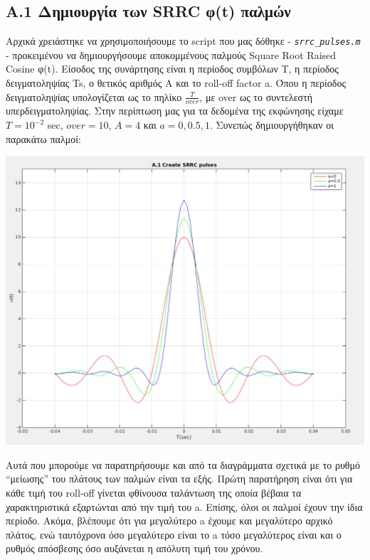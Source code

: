\documentclass[11pt]{article}
\begin{document}
    \subsection*{Α.1 Δημιουργία των SRRC φ(t) παλμών}
    Αρχικά χρειάστηκε να χρησιμοποιήσουμε το script που μας δόθηκε - \emph{\texttt{srrc\_pulses.m}} - προκειμένου να δημιουργήσουμε αποκομμένους παλμούς Square Root Raised Cosine φ(t). Είσοδος της συνάρτησης είναι η περίοδος συμβόλων T, η περίοδος δειγματοληψίας Ts, ο θετικός αριθμός Α και το roll-off factor a. Όπου η περίοδος δειγματοληψίας υπολογίζεται ως το πηλίκο $\frac{T}{over}$, με over ως το συντελεστή υπερδειγματοληψίας. Στην περίπτωση μας για τα δεδομένα της εκφώνησης είχαμε $T = {10^{−2}}$ sec, $over = 10$, $A = 4$ και $a = 0, 0.5, 1$. Συνεπώς  δημιουργήθηκαν οι παρακάτω παλμοί:

    \begin{center}{}
        \includegraphics[scale=0.27]{photos/A.1 Create SRRC pulses_screenshot.png}
    \end{center}
    
    \par \noindent
    Αυτά που μπορούμε να παρατηρήσουμε και από τα διαγράμματα σχετικά με το ρυθμό “μείωσης” του πλάτους των παλμών είναι τα εξής. Πρώτη παρατήρηση είναι ότι για κάθε τιμή του roll-off γίνεται φθίνουσα ταλάντωση της οποία βέβαια τα χαρακτηριστικά εξαρτώνται από την τιμή του a. Επίσης, όλοι οι παλμοί έχουν την ίδια περίοδο. Ακόμα, βλέπουμε ότι για μεγαλύτερο a έχουμε και μεγαλύτερο αρχικό πλάτος, ενώ ταυτόχρονα όσο μεγαλύτερο είναι το a τόσο μεγαλύτερος είναι και ο ρυθμός απόσβεσης όσο αυξάνεται η απόλυτη τιμή του χρόνου.
    
\end{document}
